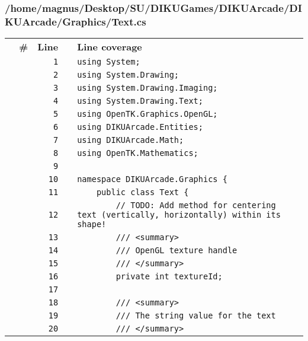 \documentclass[a4paper,landscape,10pt]{article}
\begin{document}
\subsubsection{/home/magnus/Desktop/SU/DIKUGames/DIKUArcade/DIKUArcade/Graphics/Text.cs}
\begin{longtable}[l]{lrrll}
\textbf{} & \textbf{\#} & \textbf{Line} & \textbf{} & \textbf{Line coverage}\\
\cellcolor{gray} &  & \verb~1~ & & \verb~using System;~\\
\cellcolor{gray} &  & \verb~2~ & & \verb~using System.Drawing;~\\
\cellcolor{gray} &  & \verb~3~ & & \verb~using System.Drawing.Imaging;~\\
\cellcolor{gray} &  & \verb~4~ & & \verb~using System.Drawing.Text;~\\
\cellcolor{gray} &  & \verb~5~ & & \verb~using OpenTK.Graphics.OpenGL;~\\
\cellcolor{gray} &  & \verb~6~ & & \verb~using DIKUArcade.Entities;~\\
\cellcolor{gray} &  & \verb~7~ & & \verb~using DIKUArcade.Math;~\\
\cellcolor{gray} &  & \verb~8~ & & \verb~using OpenTK.Mathematics;~\\
\cellcolor{gray} &  & \verb~9~ & & \verb~~\\
\cellcolor{gray} &  & \verb~10~ & & \verb~namespace DIKUArcade.Graphics {~\\
\cellcolor{gray} &  & \verb~11~ & & \verb~    public class Text {~\\
\cellcolor{gray} &  & \verb~12~ & & \verb~        // TODO: Add method for centering text (vertically, horizontally) within its shape!~\\
\cellcolor{gray} &  & \verb~13~ & & \verb~        /// <summary>~\\
\cellcolor{gray} &  & \verb~14~ & & \verb~        /// OpenGL texture handle~\\
\cellcolor{gray} &  & \verb~15~ & & \verb~        /// </summary>~\\
\cellcolor{gray} &  & \verb~16~ & & \verb~        private int textureId;~\\
\cellcolor{gray} &  & \verb~17~ & & \verb~~\\
\cellcolor{gray} &  & \verb~18~ & & \verb~        /// <summary>~\\
\cellcolor{gray} &  & \verb~19~ & & \verb~        /// The string value for the text~\\
\cellcolor{gray} &  & \verb~20~ & & \verb~        /// </summary>~\\

\end{longtable}
\end{document}
